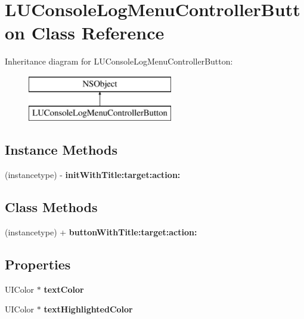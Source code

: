 \hypertarget{interface_l_u_console_log_menu_controller_button}{}\section{L\+U\+Console\+Log\+Menu\+Controller\+Button Class Reference}
\label{interface_l_u_console_log_menu_controller_button}
Inheritance diagram for L\+U\+Console\+Log\+Menu\+Controller\+Button\+:\begin{figure}[H]
\begin{center}
\leavevmode
\includegraphics[height=2.000000cm]{interface_l_u_console_log_menu_controller_button}
\end{center}
\end{figure}
\subsection*{Instance Methods}
\begin{DoxyCompactItemize}
\item 
\mbox{\label{interface_l_u_console_log_menu_controller_button_a0f1ec613e370c4cef9349fcadda5bba7}} 
(instancetype) -\/ {\bfseries init\+With\+Title\+:target\+:action\+:}
\end{DoxyCompactItemize}
\subsection*{Class Methods}
\begin{DoxyCompactItemize}
\item 
\mbox{\label{interface_l_u_console_log_menu_controller_button_ae4584fe602c9277ad58984e439c79d6f}} 
(instancetype) + {\bfseries button\+With\+Title\+:target\+:action\+:}
\end{DoxyCompactItemize}
\subsection*{Properties}
\begin{DoxyCompactItemize}
\item 
\mbox{\label{interface_l_u_console_log_menu_controller_button_a505d107fbddffc3e33ca6686cde470de}} 
U\+I\+Color $\ast$ {\bfseries text\+Color}
\item 
\mbox{\label{interface_l_u_console_log_menu_controller_button_af189f19b25c460c585f8dc53456f5288}} 
U\+I\+Color $\ast$ {\bfseries text\+Highlighted\+Color}
\end{DoxyCompactItemize}


